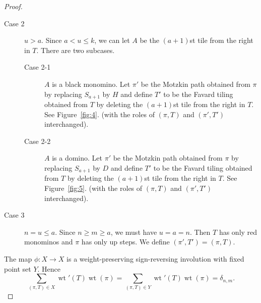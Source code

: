 \documentclass[oneside]{book}
\numberwithin{equation}{section}
\theoremstyle{definition}
\newcommand\wt{\operatorname{wt}}
\begin{document}
\begin{proof}
\begin{description}
\item[Case 2] \( u> a \). Since \( a<u\le k \), we can let \( A \) be
  the \( (a+1) \)st tile from the right in \( T \). There are two
  subcases.
  \begin{description}
  \item[Case 2-1] $A$ is a black monomino. Let \( \pi' \) be the
    Motzkin path obtained from \( \pi \) by replacing \( S_{a+1} \) by
    \( H \) and define $T'$ to be the Favard tiling obtained from $T$
    by deleting the \( (a+1) \)st tile from the right in \( T \). See
    Figure~\ref{fig:4}. (with the roles of \( (\pi,T) \) and
    \( (\pi',T') \) interchanged).
\item[Case 2-2] $A$ is a domino. Let \( \pi' \) be the
    Motzkin path obtained from \( \pi \) by replacing \( S_{a+1} \) by
    \( D \) and define $T'$ to be the Favard tiling obtained from $T$
    by deleting the \( (a+1) \)st tile from the right in \( T \). See
    Figure~\ref{fig:5}. (with the roles of \( (\pi,T) \) and
    \( (\pi',T') \) interchanged).
\end{description}
\item[Case 3] \( n = u\le a \). Since \( n\ge m \ge a \), we must have
  \( u=a=n \). Then \( T \) has only red monominos and \( \pi \) has
  only up steps. We define \( (\pi',T') = (\pi,T) \).
\end{description}


The map \( \phi:X \to X \) is a weight-preserving sign-reversing
involution with fixed point set \( Y \). Hence
\[
  \sum_{(\pi,T)\in X} \wt'(T) \wt(\pi)
  =  \sum_{(\pi,T)\in Y}\wt'(T) \wt(\pi) = \delta_{n,m}.
\]
\end{proof}
\end{document}
